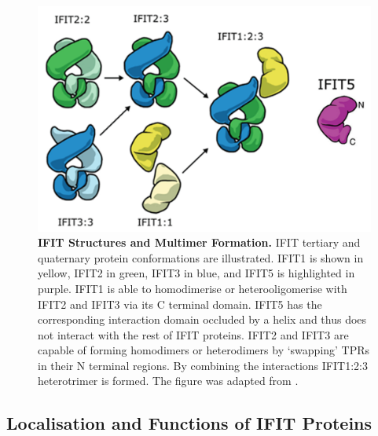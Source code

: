 \begin{figure}
    \centering
    \includegraphics[width=0.75\linewidth]{04. Introduction//Figs/05. IFIT-complexes.png}
    \caption[IFIT Structures and Multimer Formation.]{\textbf{IFIT Structures and Multimer Formation.} IFIT tertiary and quaternary protein conformations are illustrated. IFIT1 is shown in yellow, IFIT2 in green, IFIT3 in blue, and IFIT5 is highlighted in purple. IFIT1 is able to homodimerise or heterooligomerise with IFIT2 and IFIT3 via its C terminal domain. IFIT5 has the corresponding interaction domain occluded by a helix and thus does not interact with the rest of IFIT proteins. IFIT2 and IFIT3 are capable of forming homodimers or heterodimers by ‘swapping’ TPRs in their N terminal regions. By combining the interactions IFIT1:2:3 heterotrimer is formed. The figure was adapted from \cite{Mears2018BetterResponse}.}
    \label{fig:IFIT Structures and Multimer Formation.}
\end{figure}

\subsection{Localisation and Functions of IFIT Proteins} \label{subsec:Localisation and Functions of IFIT Proteins}

